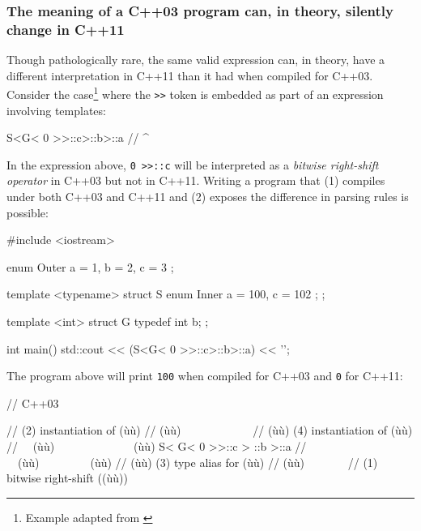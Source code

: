 \subsubsection[The meaning of a C++03 program can, in theory, silently change in C++11]{The meaning of a C++03 program can, in theory, silently change in C++11}\label{the-meaning-of-a-c++03-program-can-(in-theory)-silently-change-in-c++11}

Though pathologically rare, the same valid expression can, in theory, have a different interpretation in C++11 than it had when compiled for C++03.
Consider the case{\cprotect\footnote{Example adapted from \cite{gustedt13}}} where the
\lstinline!>>! token is embedded as part of an expression involving
templates:

\begin{emcppslisting}[emcppsignore={Pathological}]
S<G< 0 >>::c>::b>::a
//   ^~~~~~~
\end{emcppslisting}

\noindent In the expression above, \lstinline!0!~\lstinline!>>::c! will be interpreted
as a \emph{bitwise right-shift operator} in C++03 but not in C++11. Writing a program that (1) compiles under both C++03 and
C++11 and (2) exposes the difference in parsing rules is possible:

\begin{emcppshiddenlisting}[emcppsbatch=e4]
#include <iostream>
\end{emcppshiddenlisting}
\begin{emcppslisting}[emcppsbatch=e4]
enum Outer { a = 1, b = 2, c = 3 };

template <typename> struct S
{
    enum Inner { a = 100, c = 102 };
};

template <int> struct G
{
    typedef int b;
};

int main()
{
    std::cout << (S<G< 0 >>::c>::b>::a) << '\n';
}
\end{emcppslisting}

\noindent The program above will print \lstinline!100! when compiled for C++03 and
\lstinline!0! for C++11:

\begin{emcppslisting}[emcppsignore={Pathological}]
// C++03

//     (2) instantiation of (ù{}ù)
//    (ù{\codeincomments{$\|$}}ù)~~~~~~~~~~~~
//    (ù{\codeincomments{$\|\:\,|\:\,\|$}}ù)   (4) instantiation of (ù{}ù)
//  ~~(ù{\codeincomments{$\|\downarrow\|$}}ù)~~~~~~~~~~~~~~(ù{\codeincomments{$\downarrow$}}ù)
    S< G< 0 >>::c > ::b >::a
//    ~~(ù{\codeincomments{$\|\,\,\uparrow\,\,\|$}}ù)~~~~~~~~~(ù{\codeincomments{$\uparrow$}}ù)
//      (ù{\codeincomments{$\|\:\,\,\,|\:\,\,\,\|$}}ù) (3) type alias for (ù{}ù)
//      (ù{\codeincomments{$\|$}}ù)~~~~~~~
// (1) bitwise right-shift ((ù{}ù))
\end{emcppslisting}


